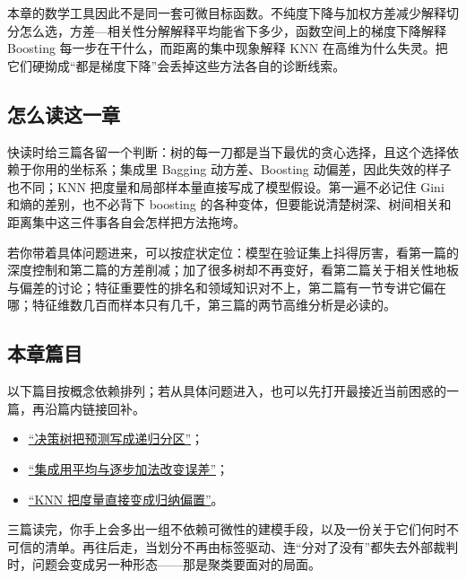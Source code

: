 本章的数学工具因此不是同一套可微目标函数。不纯度下降与加权方差减少解释切分怎么选，方差---相关性分解解释平均能省下多少，函数空间上的梯度下降解释 Boosting 每一步在干什么，而距离的集中现象解释 KNN 在高维为什么失灵。把它们硬拗成``都是梯度下降''会丢掉这些方法各自的诊断线索。

\subsection{怎么读这一章}

快读时给三篇各留一个判断：树的每一刀都是当下最优的贪心选择，且这个选择依赖于你用的坐标系；集成里 Bagging 动方差、Boosting 动偏差，因此失效的样子也不同；KNN 把度量和局部样本量直接写成了模型假设。第一遍不必记住 Gini 和熵的差别，也不必背下 boosting 的各种变体，但要能说清楚树深、树间相关和距离集中这三件事各自会怎样把方法拖垮。

若你带着具体问题进来，可以按症状定位：模型在验证集上抖得厉害，看第一篇的深度控制和第二篇的方差削减；加了很多树却不再变好，看第二篇关于相关性地板与偏差的讨论；特征重要性的排名和领域知识对不上，第二篇有一节专讲它偏在哪；特征维数几百而样本只有几千，第三篇的两节高维分析是必读的。

\subsection{本章篇目}

以下篇目按概念依赖排列；若从具体问题进入，也可以先打开最接近当前困惑的一篇，再沿篇内链接回补。

\begin{itemize}
\tightlist
\item \hyperref[sec:13-Machine-Learning/03-Trees-Ensembles-and-Neighbors/01]{``决策树把预测写成递归分区''}；
\item \hyperref[sec:13-Machine-Learning/03-Trees-Ensembles-and-Neighbors/02]{``集成用平均与逐步加法改变误差''}；
\item \hyperref[sec:13-Machine-Learning/03-Trees-Ensembles-and-Neighbors/03]{``KNN 把度量直接变成归纳偏置''}。
\end{itemize}

三篇读完，你手上会多出一组不依赖可微性的建模手段，以及一份关于它们何时不可信的清单。再往后走，当划分不再由标签驱动、连``分对了没有''都失去外部裁判时，问题会变成另一种形态——那是聚类要面对的局面。
